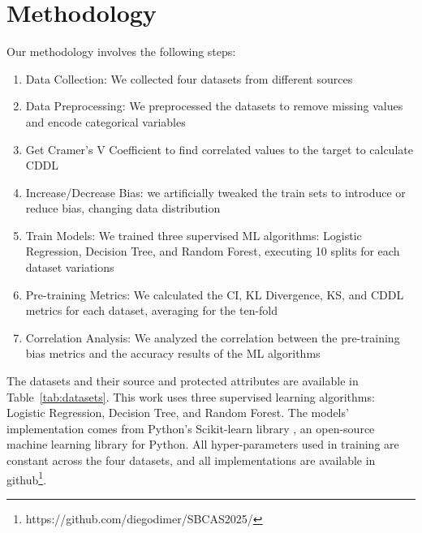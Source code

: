 \documentclass[12pt]{article}
\begin{document}

\section{Methodology}
Our methodology involves the following steps:
\begin{enumerate}
    \item Data Collection: We collected four datasets from different sources
    \item Data Preprocessing: We preprocessed the datasets to remove missing values and encode categorical variables
    \item Get Cramer's V Coefficient to find correlated values to the target to calculate CDDL
    \item Increase/Decrease Bias: we artificially tweaked the train sets to introduce or reduce bias, changing data distribution
    \item Train Models: We trained three supervised ML algorithms: Logistic Regression, Decision Tree, and Random Forest, executing 10 splits for each dataset variations
    \item Pre-training Metrics: We calculated the CI, KL Divergence, KS, and CDDL metrics for each dataset, averaging for the ten-fold
    \item Correlation Analysis: We analyzed the correlation between the pre-training bias metrics and the accuracy results of the ML algorithms
\end{enumerate}

The datasets and their source and protected attributes are available in Table~\ref{tab:datasets}. This work uses three supervised learning algorithms: Logistic Regression, Decision Tree, and Random Forest. The models' implementation comes from Python's Scikit-learn library \cite{scikit-learn}, an open-source machine learning library for Python. All hyper-parameters used in training are constant across the four datasets, and all implementations are available in github\footnote{https://github.com/diegodimer/SBCAS2025/}.
\end{document}
